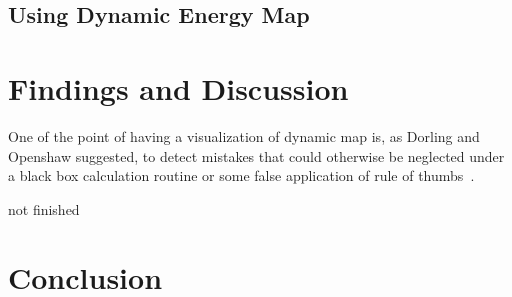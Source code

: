 \documentclass[hidelinks,12pt]{article}
\newcommand{\grey}[1]{\textcolor{black!30}{#1}}
\begin{document}
\subsection{Using Dynamic Energy Map}

\section{Findings and Discussion}
One of the point of having a visualization of dynamic map is, as
Dorling and Openshaw suggested, to detect mistakes that could
otherwise be neglected under a black box calculation routine or some
false application of rule of thumbs~\cite{Dorling1992}.

\grey{not finished}
\section{Conclusion}
\end{document}
